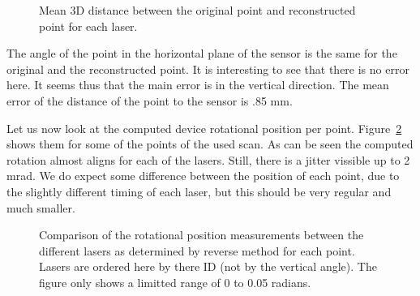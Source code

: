 \documentclass[english]{article}
\begin{document}
\begin{figure}
    \centering
    \def\svgwidth{\columnwidth}
    \scalebox{0.9}{
    \def\svgwidth{.6 \columnwidth}
      
    }
    \caption{Mean 3D distance between the original point and reconstructed point
    for each laser.}
		\label{fig:norms_error}
\end{figure}

The angle of the point in the horizontal plane of the sensor is the same for the
original and the reconstructed point. It is interesting to see that there is no
error here. It seems thus that the main error is in the vertical direction.  The
mean error of the distance of the point to the sensor is .85 mm.

Let us now look at the computed device rotational position per point. 
Figure~\ref{fig:raw_meas} shows them for some of the points of the used scan. As
can be seen the computed rotation almost aligns for each of the lasers. Still,
there is a jitter vissible up to 2 mrad. We do expect some difference between
the position of each point, due to the slightly different timing of each laser,
but this should be very regular and much smaller.

%      

\begin{figure}
  \begin{center}
    \caption{Comparison of the rotational position measurements between the
    different lasers as determined by reverse method for each point.
    Lasers are ordered here by there ID (not by the vertical angle). The figure
    only shows a limitted range of 0 to 0.05 radians.}
		\label{fig:raw_meas}
  \end{center}
\end{figure}
\end{document}
